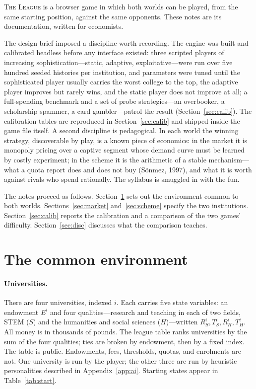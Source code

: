 \documentclass[11pt,a4paper]{article}
\newcommand{\game}{\textsc{The League}}
\begin{document}
\game{} is a browser game in which both worlds can be played, from the same starting position, against the same opponents. These notes are its documentation, written for economists.

The design brief imposed a discipline worth recording. The engine was built and calibrated headless before any interface existed: three scripted players of increasing sophistication---static, adaptive, exploitative---were run over five hundred seeded histories per institution, and parameters were tuned until the sophisticated player usually carries the worst college to the top, the adaptive player improves but rarely wins, and the static player does not improve at all; a full-spending benchmark and a set of probe strategies---an overbooker, a scholarship spammer, a card gambler---patrol the result (Section~\ref{sec:calib}). The calibration tables are reproduced in Section~\ref{sec:calib} and shipped inside the game file itself. A second discipline is pedagogical. In each world the winning strategy, discoverable by play, is a known piece of economics: in the market it is monopoly pricing over a captive segment whose demand curve must be learned by costly experiment; in the scheme it is the arithmetic of a stable mechanism---what a quota report does and does not buy (S\"onmez, 1997), and what it is worth against rivals who spend rationally. The syllabus is smuggled in with the fun.

The notes proceed as follows. Section~\ref{sec:env} sets out the environment common to both worlds. Sections~\ref{sec:market} and~\ref{sec:scheme} specify the two institutions. Section~\ref{sec:calib} reports the calibration and a comparison of the two games' difficulty. Section~\ref{sec:disc} discusses what the comparison teaches.

\section{The common environment}\label{sec:env}

\paragraph{Universities.} There are four universities, indexed $i$. Each carries five state variables: an endowment $E^i$ and four qualities---research and teaching in each of two fields, STEM ($S$) and the humanities and social sciences ($H$)---written $R_S^i, T_S^i, R_H^i, T_H^i$. All money is in thousands of pounds. The league table ranks universities by the sum of the four qualities; ties are broken by endowment, then by a fixed index. The table is public. Endowments, fees, thresholds, quotas, and enrolments are not. One university is run by the player; the other three are run by heuristic personalities described in Appendix~\ref{app:ai}. Starting states appear in Table~\ref{tab:start}.
\end{document}
